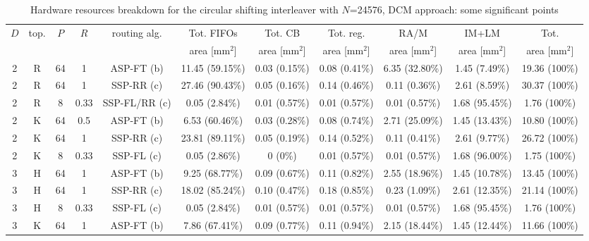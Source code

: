 \documentclass[10pt,twocolumn,journal]{IEEEtran}
\begin{document}
\begin{table*}[t!]
  \centering
  \begin{threeparttable}[t]  
  \caption{Hardware resources breakdown for the circular shifting interleaver with $N$=24576, DCM approach: some significant points} \label{tab:percentage}
  \begin{tabular}{|c|c|c|c|c|c|c|c|c|c|c|}
    \hline
$D$ & top. & $P$ & $R$ & routing alg. & Tot. FIFOs    & Tot. CB       & Tot. reg.     & RA/M          & IM+LM & Tot. \\
    &      &     &     &            & area [mm$^2$] & area [mm$^2$] & area [mm$^2$] & area [mm$^2$] & area [mm$^2$] & area [mm$^2$] \\
    \hline 
\rowcolor[gray]{0.9} 2   & R    & 64  & 1   & ASP-FT (b) & 11.45 (59.15\%) & 0.03 (0.15\%) & 0.08 (0.41\%) & 6.35 (32.80\%) & 1.45 (7.49\%) & 19.36 (100\%) \\
\rowcolor[gray]{0.8} 2   & R    & 64  & 1   & SSP-RR (c) & 27.46 (90.43\%) & 0.05 (0.16\%) & 0.14 (0.46\%) & 0.11 (0.36\%) & 2.61 (8.59\%) & 30.37 (100\%) \\
\rowcolor[gray]{0.7} 2   & R    & 8   & 0.33 & SSP-FL/RR (c) & 0.05 (2.84\%) & 0.01 (0.57\%) & 0.01 (0.57\%) & 0.01 (0.57\%) & 1.68 (95.45\%) & 1.76 (100\%) \\
\rowcolor[gray]{0.9} 2   & K    & 64  & 0.5 & ASP-FT (b) & 6.53 (60.46\%) & 0.03 (0.28\%) & 0.08 (0.74\%) & 2.71 (25.09\%) & 1.45 (13.43\%) & 10.80 (100\%) \\
\rowcolor[gray]{0.8} 2   & K    & 64  & 1 & SSP-RR (c) & 23.81 (89.11\%) & 0.05 (0.19\%) & 0.14 (0.52\%) & 0.11 (0.41\%) & 2.61 (9.77\%) & 26.72 (100\%) \\
\rowcolor[gray]{0.7} 2   & K    & 8  & 0.33 & SSP-FL (c) & 0.05 (2.86\%) & 0 (0\%)\tnote{(1)} & 0.01 (0.57\%) & 0.01 (0.57\%) & 1.68 (96.00\%) & 1.75 (100\%) \\
\hline
\rowcolor[gray]{0.9} 3   & H    & 64  &  1  & ASP-FT (b) & 9.25 (68.77\%) & 0.09 (0.67\%) & 0.11 (0.82\%) & 2.55 (18.96\%) & 1.45 (10.78\%) & 13.45 (100\%) \\
\rowcolor[gray]{0.8} 3   & H    & 64  &  1  & SSP-RR (c) & 18.02 (85.24\%) & 0.10 (0.47\%) & 0.18 (0.85\%) & 0.23 (1.09\%) & 2.61 (12.35\%) & 21.14 (100\%) \\
\rowcolor[gray]{0.7} 3   & H    & 8  &  0.33  & SSP-FL (c) & 0.05 (2.84\%) & 0.01 (0.57\%) & 0.01 (0.57\%) & 0.01 (0.57\%) & 1.68 (95.45\%) & 1.76 (100\%) \\
\rowcolor[gray]{0.9} 3   & K    & 64  &  1  & ASP-FT (b) & 7.86 (67.41\%) & 0.09 (0.77\%) & 0.11 (0.94\%) & 2.15 (18.44\%) & 1.45 (12.44\%) & 11.66 (100\%) \\

\end{tabular}
\end{threeparttable}
\end{table*}
\end{document}
